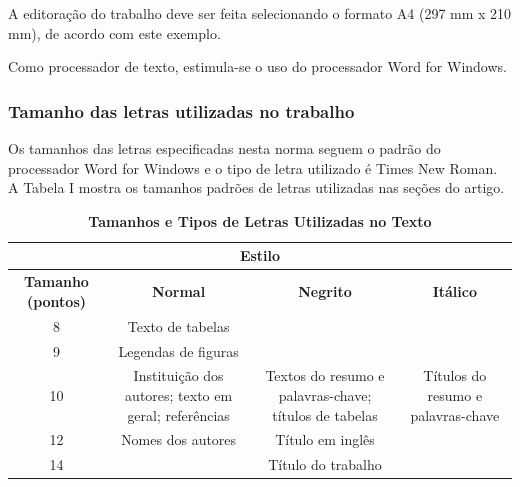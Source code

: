 A editoração do trabalho deve ser feita selecionando o formato A4 (297 mm x 210 mm), de acordo com este exemplo.

Como processador de texto, estimula-se o uso do processador Word for Windows.

\subsubsection{Tamanho das letras utilizadas no trabalho}

Os tamanhos das letras especificadas nesta norma seguem o padrão do processador Word for Windows e o tipo de letra utilizado é Times New Roman. A Tabela I mostra os tamanhos padrões de letras utilizadas nas seções do artigo.

\begin{table}[!ht]
	\centering
	\caption{\textbf{Tamanhos e Tipos de Letras Utilizadas no Texto}}
	\footnotesize
	\setlength{\tabcolsep}{5pt}
	\begin{tabular}{cccc}
		\toprule [1.3pt]	
		\multicolumn{4}{c}{ \textbf{Estilo} } \\
		\hline
		\multirow{2}{1.1cm}{\centering \textbf{Tamanho (pontos)}} & \multirow{2}{*}{\textbf{Normal}} &
		\multirow{2}{*}{\textbf{Negrito}} & \multirow{2}{*}{\textbf{Itálico}} \\
		&  &  & \\		
		\hline
		8 & Texto de tabelas &  &  \\
		\hline
		\multirow{2}{*}{9} & \multirow{2}{2cm}{\centering Legendas de figuras}  &  &  \\
		& & & \\
		\hline
		\multirow{3}{*}{10} &  
		\multirow{3}{2cm}{\centering Instituição dos autores; texto em geral; referências}  & 
		\multirow{3}{2cm}{\centering Textos do resumo e palavras-chave; títulos de tabelas} & 
		\multirow{3}{2.1cm}{\centering Títulos do resumo e palavras-chave} \\
		& &  &  \\
		& &  &  \\
		\hline
		\multirow{2}{*}{12} & \multirow{2}{2cm}{\centering Nomes dos autores}  & \multirow{2}{*}{Título em inglês} &  \\
		& & & \\
		\hline
		14 &  & Título do trabalho & \vspace*{-0.8mm}\\
		\bottomrule[1.3pt]
	\end{tabular} \label{table:TabelaI}
\end{table}

